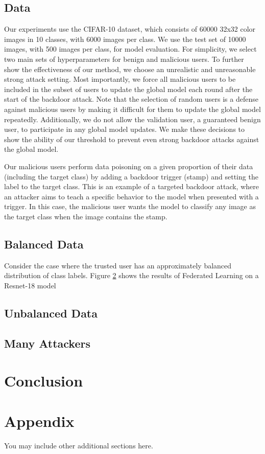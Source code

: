 \documentclass{article} %
\begin{document}
\subsection{Data}
Our experiments use the CIFAR-10 dataset, which consists of 60000 32x32 color images in 10 classes, with 6000 images per class. We use the test set of 10000 images, with 500 images per class, for model evaluation. For simplicity, we select two main sets of hyperparameters for benign and malicious users. To further show the effectiveness of our method, we choose an unrealistic and unreasonable strong attack setting. Most importantly, we force all malicious users to be included in the subset of users to update the global model each round after the start of the backdoor attack. Note that the selection of random users is a defense against malicious users by making it difficult for them to update the global model repeatedly. Additionally, we do not allow the validation user, a guaranteed benign user, to participate in any global model updates. We make these decisions to show the ability of our threshold to prevent even strong backdoor attacks against the global model.

Our malicious users perform data poisoning on a given proportion of their data (including the target class) by adding a backdoor trigger (stamp) and setting the label to the target class. This is an example of a targeted backdoor attack, where an attacker aims to teach a specific behavior to the model when presented with a trigger. In this case, the malicious user wants the model to classify any image as the target class when the image contains the stamp.

%
\subsection{Balanced Data}
Consider the case where the trusted user has an approximately balanced distribution of class labels. Figure \ref{} shows the results of Federated Learning on a Resnet-18 model 

\subsection{Unbalanced Data}



\subsection{Many Attackers}



\section{Conclusion}





\appendix
\section{Appendix}
You may include other additional sections here.
\end{document}
